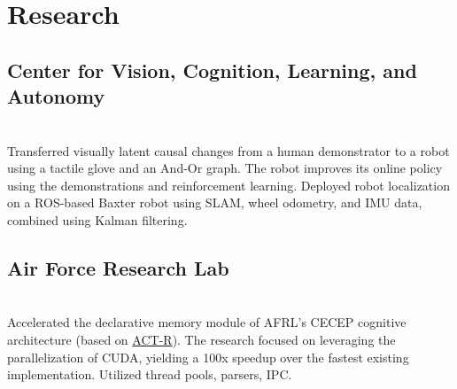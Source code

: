 \documentclass[letterpaper]{deedy-resume} %
\begin{document}
\hfill
%
%
\begin{minipage}[t]{0.66\textwidth} %


\section{Research}

\subsection{Center for Vision, Cognition, Learning, and Autonomy}
 \hfill {} \\ 
\smallsectionspace
Transferred visually latent causal changes from a human demonstrator to a robot using a tactile glove and an And-Or graph. The robot improves its online policy using the demonstrations and reinforcement learning. Deployed robot localization on a ROS-based Baxter robot using SLAM, wheel odometry, and IMU data, combined using Kalman filtering.

\sectionspace %


\subsection{Air Force Research Lab}
 \hfill {} \\
\smallsectionspace %
Accelerated the declarative memory module of AFRL's CECEP cognitive architecture (based on \href{http://act-r.psy.cmu.edu/}{ACT-R}). The research focused on leveraging the parallelization of CUDA, yielding a 100x speedup over the fastest existing implementation. Utilized thread pools, parsers, IPC.

\sectionspace %



\end{minipage}
\end{document}
